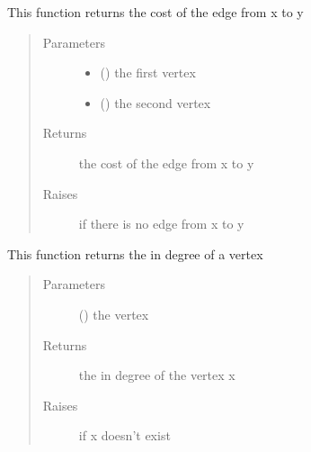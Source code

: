 \documentclass[letterpaper,10pt,english]{sphinxmanual}
\begin{document}
\begin{fulllineitems}
\begin{fulllineitems}
\label{\detokenize{Graph:Graph.Graph.get_edge_cost}}
This function returns the cost of the edge from x to y
\begin{quote}\begin{description}
\item[{Parameters}] \leavevmode\begin{itemize}
\item {} 
 () \textendash{} the first vertex

\item {} 
 () \textendash{} the second vertex

\end{itemize}

\item[{Returns}] \leavevmode
the cost of the edge from x to y

\item[{Raises}] \leavevmode
{} \textendash{} if there is no edge from x to y

\end{description}\end{quote}

\end{fulllineitems}


\begin{fulllineitems}
\label{\detokenize{Graph:Graph.Graph.get_in_degree}}
This function returns the in degree of a vertex
\begin{quote}\begin{description}
\item[{Parameters}] \leavevmode
{} () \textendash{} the vertex

\item[{Returns}] \leavevmode
the in degree of the vertex x

\item[{Raises}] \leavevmode
{} \textendash{} if x doesn’t exist


\end{description}
\end{quote}
\end{fulllineitems}
\end{fulllineitems}
\end{document}
